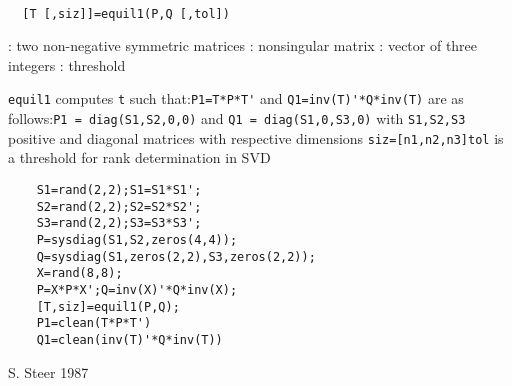 \begin{mandesc}
   \\ %
\end{mandesc}
\begin{calling_sequence}
\begin{verbatim}
  [T [,siz]]=equil1(P,Q [,tol])  
\end{verbatim}
\end{calling_sequence}
\begin{parameters}
  \begin{varlist}
    : two non-negative symmetric matrices
    : nonsingular matrix
    : vector of three integers
    : threshold
  \end{varlist}
\end{parameters}
\begin{mandescription}
  \verb!equil1! computes \verb!t! such that:\verb!P1=T*P*T'!  and
  \verb!Q1=inv(T)'*Q*inv(T)! are as follows:\verb!P1 = diag(S1,S2,0,0)!  and
  \verb!Q1 = diag(S1,0,S3,0)! with \verb!S1,S2,S3! positive and diagonal
  matrices with respective dimensions \verb!siz=[n1,n2,n3]!\verb!tol! is a
  threshold for rank determination in SVD
\end{mandescription}
\begin{examples}
  \begin{Verbatim}
    S1=rand(2,2);S1=S1*S1';
    S2=rand(2,2);S2=S2*S2';
    S3=rand(2,2);S3=S3*S3';
    P=sysdiag(S1,S2,zeros(4,4));
    Q=sysdiag(S1,zeros(2,2),S3,zeros(2,2));
    X=rand(8,8);
    P=X*P*X';Q=inv(X)'*Q*inv(X);
    [T,siz]=equil1(P,Q);
    P1=clean(T*P*T')
    Q1=clean(inv(T)'*Q*inv(T))
  \end{Verbatim}
\end{examples}
\begin{manseealso}
       
\end{manseealso}
\begin{authors}
  S. Steer 1987
\end{authors}
